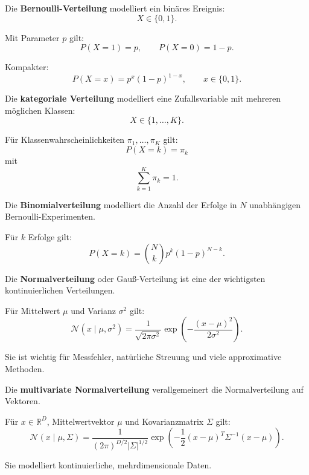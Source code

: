 \documentclass[11pt,a4paper]{scrartcl}
\begin{document}
\begin{solutionbox}
    Die \textbf{Bernoulli-Verteilung} modelliert ein binäres Ereignis:
    \[
        X \in \{0,1\}.
    \]

    Mit Parameter \(p\) gilt:
    \[
        P(X=1)=p,
        \qquad
        P(X=0)=1-p.
    \]

    Kompakter:
    \[
        P(X=x)
        =
        p^x(1-p)^{1-x},
        \qquad x \in \{0,1\}.
    \]
\end{solutionbox}

\begin{solutionbox}
    Die \textbf{kategoriale Verteilung} modelliert eine Zufallsvariable mit
    mehreren möglichen Klassen:
    \[
        X \in \{1,\dots,K\}.
    \]

    Für Klassenwahrscheinlichkeiten \(\pi_1,\dots,\pi_K\) gilt:
    \[
        P(X=k)
        =
        \pi_k
    \]
    mit
    \[
        \sum_{k=1}^K \pi_k = 1.
    \]
\end{solutionbox}

\begin{solutionbox}
    Die \textbf{Binomialverteilung} modelliert die Anzahl der Erfolge in \(N\)
    unabhängigen Bernoulli-Experimenten.

    Für \(k\) Erfolge gilt:
    \[
        P(X=k)
        =
        \binom{N}{k}
        p^k(1-p)^{N-k}.
    \]
\end{solutionbox}

\begin{solutionbox}
    Die \textbf{Normalverteilung} oder Gauß-Verteilung ist eine der wichtigsten
    kontinuierlichen Verteilungen.

    Für Mittelwert \(\mu\) und Varianz \(\sigma^2\) gilt:
    \[
        \mathcal{N}(x \mid \mu,\sigma^2)
        =
        \frac{1}{\sqrt{2\pi\sigma^2}}
        \exp\left(
            -\frac{(x-\mu)^2}{2\sigma^2}
        \right).
    \]

    Sie ist wichtig für Messfehler, natürliche Streuung und viele approximative
    Methoden.
\end{solutionbox}

\begin{solutionbox}
    Die \textbf{multivariate Normalverteilung} verallgemeinert die
    Normalverteilung auf Vektoren.

    Für \(x \in \mathbb{R}^D\), Mittelwertvektor \(\mu\) und Kovarianzmatrix
    \(\Sigma\) gilt:
    \[
        \mathcal{N}(x \mid \mu,\Sigma)
        =
        \frac{1}{(2\pi)^{D/2}|\Sigma|^{1/2}}
        \exp\left(
            -\frac{1}{2}
            (x-\mu)^T
            \Sigma^{-1}
            (x-\mu)
        \right).
    \]

    Sie modelliert kontinuierliche, mehrdimensionale Daten.
\end{solutionbox}
\end{document}
